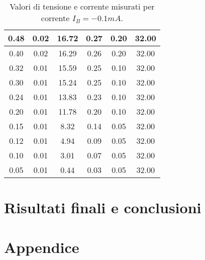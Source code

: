 \documentclass[a4paper, 11pt]{article}
\begin{document}
\begin{table}[!htb]
\begin{tabular}{|c|c|c|c|c|c|}
        \hline 
        0.48 & 0.02 & 16.72 & 0.27 & 0.20 & 32.00 \\
        \hline 
        0.40 & 0.02 & 16.29 & 0.26 & 0.20 & 32.00 \\
        \hline 
        0.32 & 0.01 & 15.59 & 0.25 & 0.10 & 32.00 \\
        \hline 
        0.30 & 0.01 & 15.24 & 0.25 & 0.10 & 32.00 \\
        \hline 
        0.24 & 0.01 & 13.83 & 0.23 & 0.10 & 32.00 \\
        \hline 
        0.20 & 0.01 & 11.78 & 0.20 & 0.10 & 32.00 \\
        \hline 
        0.15 & 0.01 & 8.32 & 0.14 & 0.05 & 32.00 \\
        \hline 
        0.12 & 0.01 & 4.94 & 0.09 &	0.05 & 32.00 \\
        \hline 
        0.10 & 0.01 & 3.01 & 0.07 &	0.05 & 32.00 \\
        \hline 
        0.05 & 0.01 & 0.44 & 0.03 &	0.05 & 32.00 \\
        \hline 
    \end{tabular} 
    \caption{Valori di tensione e corrente misurati per corrente $I_B = -0.1 mA$.}
    \label{tab:-0.1 mA}
\end{table}


\section{Risultati finali e conclusioni}

\section{Appendice}
\end{document}

